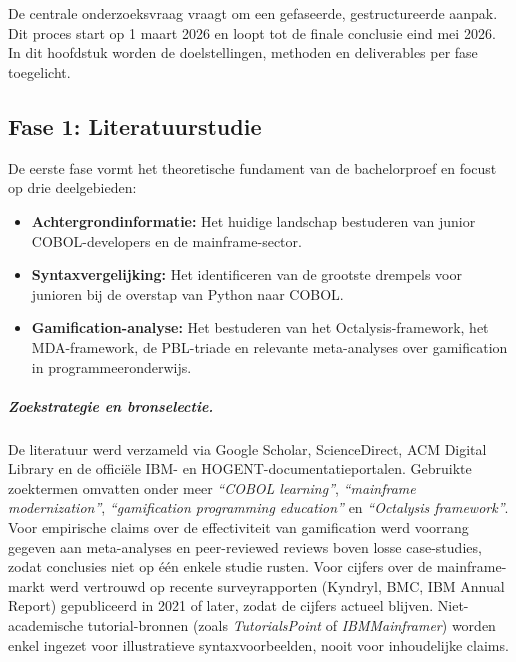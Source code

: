 
\chapter{}%
\label{ch:methodologie}

De centrale onderzoeksvraag vraagt om een gefaseerde, gestructureerde aanpak. Dit proces start op 1 maart 2026 en loopt tot de finale conclusie eind mei 2026. In dit hoofdstuk worden de doelstellingen, methoden en deliverables per fase toegelicht.

\section{Fase 1: Literatuurstudie}
De eerste fase vormt het theoretische fundament van de bachelorproef en focust op drie deelgebieden:
\begin{itemize}
    \item \textbf{Achtergrondinformatie:} Het huidige landschap bestuderen van junior COBOL-developers en de mainframe-sector.
    \item \textbf{Syntaxvergelijking:} Het identificeren van de grootste drempels voor junioren bij de overstap van Python naar COBOL.
    \item \textbf{Gamification-analyse:} Het bestuderen van het Octalysis-framework, het MDA-framework, de PBL-triade en relevante meta-analyses over gamification in programmeeronderwijs.
\end{itemize}

\paragraph{Zoekstrategie en bronselectie.}
De literatuur werd verzameld via Google Scholar, ScienceDirect, ACM Digital Library en de officiële IBM- en HOGENT-documentatieportalen. Gebruikte zoektermen omvatten onder meer \textit{``COBOL learning''}, \textit{``mainframe modernization''}, \textit{``gamification programming education''} en \textit{``Octalysis framework''}. 
Voor empirische claims over de effectiviteit van gamification werd voorrang gegeven aan meta-analyses en peer-reviewed reviews boven losse case-studies, zodat conclusies niet op één enkele studie rusten. 
Voor cijfers over de mainframe-markt werd vertrouwd op recente surveyrapporten (Kyndryl, BMC, IBM Annual Report) gepubliceerd in 2021 of later, zodat de cijfers actueel blijven. 
Niet-academische tutorial-bronnen (zoals \textit{TutorialsPoint} of \textit{IBMMainframer}) worden enkel ingezet voor illustratieve syntaxvoorbeelden, nooit voor inhoudelijke claims.

